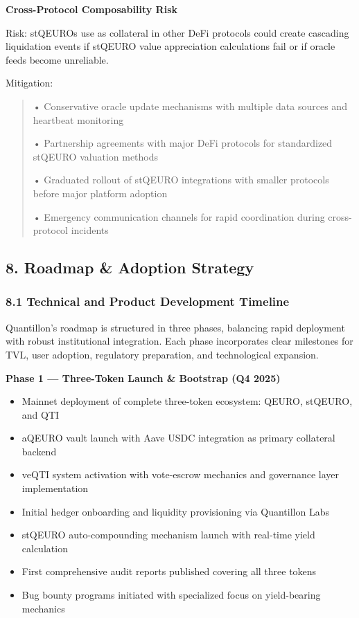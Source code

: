 \textbf{Cross-Protocol Composability Risk}

Risk: stQEURO\textquotesingle s use as collateral in other DeFi
protocols could create cascading liquidation events if stQEURO value
appreciation calculations fail or if oracle feeds become unreliable.

Mitigation:

\begin{quote}
• Conservative oracle update mechanisms with multiple data sources and
heartbeat monitoring

• Partnership agreements with major DeFi protocols for standardized
stQEURO valuation methods

• Graduated rollout of stQEURO integrations with smaller protocols
before major platform adoption

• Emergency communication channels for rapid coordination during
cross-protocol incidents
\end{quote}

\hypertarget{roadmap-adoption-strategy}{%
\subsection{8. Roadmap \& Adoption
Strategy}\label{roadmap-adoption-strategy}}

\hypertarget{technical-and-product-development-timeline}{%
\subsubsection{8.1 Technical and Product Development
Timeline}\label{technical-and-product-development-timeline}}

Quantillon's roadmap is structured in three phases, balancing rapid
deployment with robust institutional integration. Each phase
incorporates clear milestones for TVL, user adoption, regulatory
preparation, and technological expansion.

\textbf{Phase 1 --- Three-Token Launch \& Bootstrap (Q4 2025)}

\begin{itemize}
\item
  Mainnet deployment of complete three-token ecosystem: QEURO, stQEURO,
  and QTI
\item
  aQEURO vault launch with Aave USDC integration as primary collateral
  backend
\item
  veQTI system activation with vote-escrow mechanics and governance
  layer implementation
\item
  Initial hedger onboarding and liquidity provisioning via Quantillon
  Labs
\item
  stQEURO auto-compounding mechanism launch with real-time yield
  calculation
\item
  First comprehensive audit reports published covering all three tokens
\item
  Bug bounty programs initiated with specialized focus on yield-bearing
  mechanics
\end{itemize}

